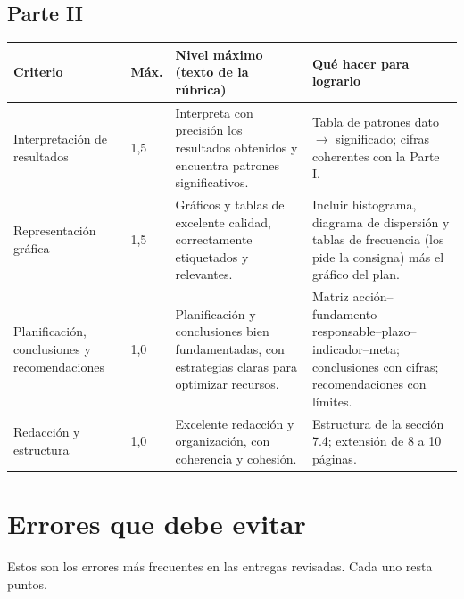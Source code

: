 \subsection{Parte II}
\begin{center}
\scriptsize
\begin{tabularx}{\textwidth}{@{}p{2.2cm}p{0.6cm}XX@{}}
\toprule
\textbf{Criterio} & \textbf{Máx.} & \textbf{Nivel máximo (texto de la rúbrica)} & \textbf{Qué hacer para lograrlo}\\
\midrule
Interpretación de resultados & 1,5 & Interpreta con precisión los resultados obtenidos y encuentra patrones significativos. & Tabla de patrones dato $\rightarrow$ significado; cifras coherentes con la Parte I.\\[3pt]
Representación gráfica & 1,5 & Gráficos y tablas de excelente calidad, correctamente etiquetados y relevantes. & Incluir histograma, diagrama de dispersión y tablas de frecuencia (los pide la consigna) más el gráfico del plan.\\[3pt]
Planificación, conclusiones y recomendaciones & 1,0 & Planificación y conclusiones bien fundamentadas, con estrategias claras para optimizar recursos. & Matriz acción--fundamento--responsable--plazo--indicador--meta; conclusiones con cifras; recomendaciones con límites.\\[3pt]
Redacción y estructura & 1,0 & Excelente redacción y organización, con coherencia y cohesión. & Estructura de la sección 7.4; extensión de 8 a 10 páginas.\\
\bottomrule
\end{tabularx}
\end{center}

\section{Errores que debe evitar}

Estos son los errores más frecuentes en las entregas revisadas. Cada uno resta puntos.

